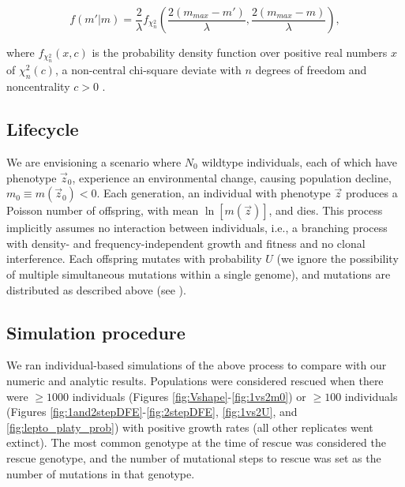 \documentclass[9pt,twocolumn,twoside,lineno]{gsajnl}
\begin{document}
\begin{equation}\label{eq:fm}
f(m' | m) = \frac{2}{\lambda} f_{\chi_n^2} \left( \frac{2(m_{max} - m')}{\lambda}, \frac{2(m_{max}-m)}{\lambda} \right),
\end{equation}

\noindent where $f_{\chi_n^2}(x, c)$ is the probability density function over positive real numbers $x$ of $\chi_n^2(c)$, a non-central chi-square deviate with $n$ degrees of freedom and noncentrality $c>0$ \citep[equation 26.4.25 in][]{Abramowitz1972}.

\subsection{Lifecycle}

We are envisioning a scenario where $N_0$ wildtype individuals, each of which have phenotype $\vec{z}_0$, experience an environmental change, causing population decline, $m_0\equiv m(\vec{z}_0)<0$.
Each generation, an individual with phenotype $\vec{z}$ produces a Poisson number of offspring, with mean $\ln[m(\vec{z})]$, and dies.
This process implicitly assumes no interaction between individuals, i.e., a branching process with density- and frequency-independent growth and fitness and no clonal interference.
Each offspring mutates with probability $U$ (we ignore the possibility of multiple simultaneous mutations within a single genome), and mutations are distributed as described above (see ).

\subsection{Simulation procedure}
\label{sec:sims}

We ran individual-based simulations of the above process to compare with our numeric and analytic results.
Populations were considered rescued when there were $\geq1000$ individuals (Figures \ref{fig:Vshape}-\ref{fig:1vs2m0}) or $\geq100$ individuals (Figures \ref{fig:1and2stepDFE}-\ref{fig:2stepDFE}, \ref{fig:1vs2U}, and \ref{fig:lepto_platy_prob}) with positive growth rates (all other replicates went extinct).
The most common genotype at the time of rescue was considered the rescue genotype, and the number of mutational steps to rescue was set as the number of mutations in that genotype. 

\end{document}

